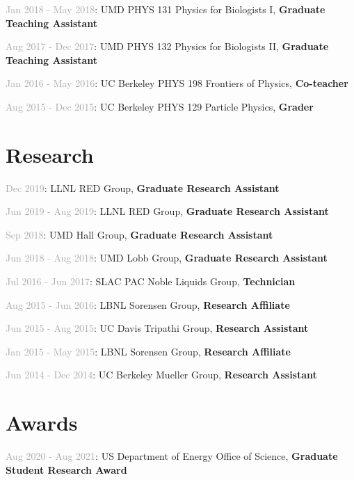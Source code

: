 \documentclass[
  10pt,
  letterpaper,
  DIV=11,
  numbers=noendperiod]{scrartcl}
\begin{document}
\textcolor{darkgray}{Jan 2018 - May 2018}: UMD PHYS 131 Physics for
Biologists I, \textbf{Graduate Teaching Assistant}

\textcolor{darkgray}{Aug 2017 - Dec 2017}: UMD PHYS 132 Physics for
Biologists II, \textbf{Graduate Teaching Assistant}

\textcolor{darkgray}{Jan 2016 - May 2016}: UC Berkeley PHYS 198
Frontiers of Physics, \textbf{Co-teacher}

\textcolor{darkgray}{Aug 2015 - Dec 2015}: UC Berkeley PHYS 129 Particle
Physics, \textbf{Grader}

\hypertarget{fa-atom-research}{%
\section{\texorpdfstring{
Research}{ Research}}\label{fa-atom-research}}

\textcolor{darkgray}{Dec 2019}: LLNL RED Group, \textbf{Graduate
Research Assistant}

\textcolor{darkgray}{Jun 2019 - Aug 2019}: LLNL RED Group,
\textbf{Graduate Research Assistant}

\textcolor{darkgray}{Sep 2018}: UMD Hall Group, \textbf{Graduate
Research Assistant}

\textcolor{darkgray}{Jun 2018 - Aug 2018}: UMD Lobb Group,
\textbf{Graduate Research Assistant}

\textcolor{darkgray}{Jul 2016 - Jun 2017}: SLAC PAC Noble Liquids Group,
\textbf{Technician}

\textcolor{darkgray}{Aug 2015 - Jun 2016}: LBNL Sorensen Group,
\textbf{Research Affiliate}

\textcolor{darkgray}{Jun 2015 - Aug 2015}: UC Davis Tripathi Group,
\textbf{Research Assistant}

\textcolor{darkgray}{Jan 2015 - May 2015}: LBNL Sorensen Group,
\textbf{Research Affiliate}

\textcolor{darkgray}{Jun 2014 - Dec 2014}: UC Berkeley Mueller Group,
\textbf{Research Assistant}

\hypertarget{fa-trophy-awards}{%
\section{\texorpdfstring{
Awards}{ Awards}}\label{fa-trophy-awards}}

\textcolor{darkgray}{Aug 2020 - Aug 2021}: US Department of Energy
Office of Science, \textbf{Graduate Student Research Award}
\end{document}
